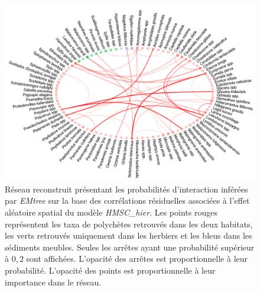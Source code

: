 \documentclass[12pt,]{article}
\makeatletter
\def\maxwidth{\ifdim\Gin@nat@width>\linewidth\linewidth
\else\Gin@nat@width\fi}
\let\Oldincludegraphics\includegraphics
\renewcommand{\includegraphics}[1]{\Oldincludegraphics[width=\maxwidth]{#1}}
\makeatother
\begin{document}
\begin{figure}
\hypertarget{fig:nethmscsamp}{%
\centering
\includegraphics{figures/hmsc-samp-network-1.png}
\caption{Réseau reconstruit présentant les probabilités d'interaction
inférées par \emph{EMtree} sur la base des corrélations résiduelles
associées à l'effet aléatoire spatial du modèle \emph{HMSC\_hier}. Les
points rouges représentent les taxa de polychètes retrouvés dans les
deux habitats, les verts retrouvés uniquement dans les herbiers et les
bleus dans les sédiments meubles. Seules les arrêtes ayant une
probabilité supérieur à \(0,2\) sont affichées. L'opacité des arrêtes
est proportionnelle à leur probabilité. L'opacité des points est
proportionnelle à leur importance dans le
réseau.}\label{fig:nethmscsamp}
}
\end{figure}
\end{document}
